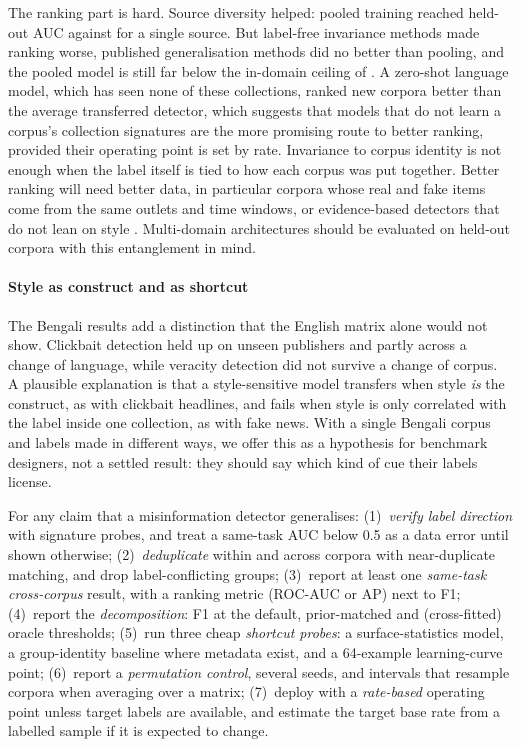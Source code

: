 The ranking part is hard. Source diversity helped: pooled training reached \LocoPooled{} held-out AUC against \LocoMeanSingle{} for a single source. But label-free invariance methods made ranking worse, published generalisation methods did no better than pooling, and the pooled model is still far below the in-domain ceiling of \LocoCeiling{}. A zero-shot language model, which has seen none of these collections, ranked new corpora better than the average transferred detector, which suggests that models that do not learn a corpus's collection signatures are the more promising route to better ranking, provided their operating point is set by rate. Invariance to corpus identity is not enough when the label itself is tied to how each corpus was put together. Better ranking will need better data, in particular corpora whose real and fake items come from the same outlets and time windows, or evidence-based detectors that do not lean on style \citep{pelrine2023gpt4,thibault2025guide}. Multi-domain architectures \citep{nan2021mdfend,zhu2022endef} should be evaluated on held-out corpora with this entanglement in mind.

\paragraph{Style as construct and as shortcut}
The Bengali results add a distinction that the English matrix alone would not show. Clickbait detection held up on unseen publishers and partly across a change of language, while veracity detection did not survive a change of corpus. A plausible explanation is that a style-sensitive model transfers when style \emph{is} the construct, as with clickbait headlines, and fails when style is only correlated with the label inside one collection, as with fake news. With a single Bengali corpus and labels made in different ways, we offer this as a hypothesis for benchmark designers, not a settled result: they should say which kind of cue their labels license.

\begin{protocol}
For any claim that a misinformation detector generalises:
(1)~\emph{verify label direction} with signature probes, and treat a same-task AUC below 0.5 as a data error until shown otherwise;
(2)~\emph{deduplicate} within and across corpora with near-duplicate matching, and drop label-conflicting groups;
(3)~report at least one \emph{same-task cross-corpus} result, with a ranking metric (ROC-AUC or AP) next to F1;
(4)~report the \emph{decomposition}: F1 at the default, prior-matched and (cross-fitted) oracle thresholds;
(5)~run three cheap \emph{shortcut probes}: a surface-statistics model, a group-identity baseline where metadata exist, and a 64-example learning-curve point;
(6)~report a \emph{permutation control}, several seeds, and intervals that resample corpora when averaging over a matrix;
(7)~deploy with a \emph{rate-based} operating point unless target labels are available, and estimate the target base rate from a labelled sample if it is expected to change.
\end{protocol}

